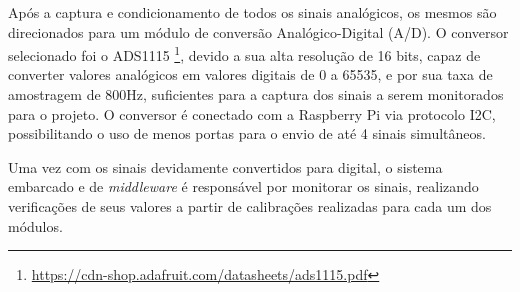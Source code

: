 Após a captura e condicionamento de todos os sinais analógicos, os mesmos são direcionados
para um módulo de conversão Analógico-Digital (A/D). O conversor selecionado foi o ADS1115 \footnote{\url{https://cdn-shop.adafruit.com/datasheets/ads1115.pdf}},
devido a sua alta resolução de 16 bits, capaz de converter valores analógicos em valores
digitais de 0 a 65535, e por sua taxa de amostragem de 800Hz, suficientes para a captura dos
sinais a serem monitorados para o projeto. O conversor é conectado com a Raspberry Pi via protocolo I2C,
possibilitando o uso de menos portas para o envio de até 4 sinais simultâneos.

Uma vez com os sinais devidamente convertidos para digital, o sistema embarcado e de \textit{middleware}
é responsável por monitorar os sinais, realizando verificações de seus valores a partir de calibrações
realizadas para cada um dos módulos.
